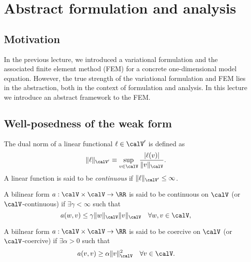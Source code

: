 \chapter{Abstract formulation and analysis}

\disclaimer

\section{Motivation}
In the previous lecture, we introduced a variational formulation and the associated finite element method (FEM) for a concrete one-dimensional model equation.  However, the true strength of the variational formulation and FEM lies in the abstraction, both in the context of formulation and analysis.  In this lecture we introduce an abstract framework to the FEM.



\section{Well-posedness of the weak form}

\begin{definition}
  The dual norm of a linear functional $\ell \in \calV'$ is defined as
  \begin{equation*}
    \| \ell \|_{\calV'} \equiv \sup_{v \in \calV} \frac{|\ell(v)|}{\| v \|_\calV}.
  \end{equation*}
  A linear function is said to be \emph{continuous} if $\| \ell \|_{\calV'} \leq \infty$.
\end{definition}

\begin{definition}[continuity]
  \label{def:th_continuity}
  A bilinear form $a: \calV \times \calV \to \RR$ is said to be continuous on $\calV$ (or $\calV$-continuous) if $\exists \gamma < \infty$ such that 
  \begin{equation*}
    a(w,v) \leq \gamma \| w \|_\calV \| v \|_\calV \quad \forall w,v \in \calV,
  \end{equation*}
\end{definition}

\begin{definition}[coercivity]
  \label{def:th_coercivity}
  A biilnear form $a: \calV \times \calV \to \RR$ is said to be coercive on $\calV$ (or $\calV$-coercive) if $\exists \alpha > 0$ such that 
  \begin{equation*}
    a(v,v) \geq \alpha \| v \|_\calV^2 \quad \forall v \in \calV.
  \end{equation*}
\end{definition}

